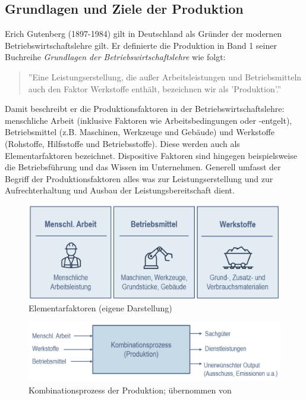 \documentclass[a4paper,12pt, german]{report}
\begin{document}
\subsection{Grundlagen und Ziele der Produktion}

Erich Gutenberg (1897-1984) gilt in Deutschland als Gründer der modernen Betriebswirtschaftslehre gilt. Er definierte die Produktion in Band 1 seiner Buchreihe \textit{Grundlagen der Betriebswirtschaftslehre} wie folgt:

\begin{quote}
 ''Eine Leistungserstellung, die außer Arbeitsleistungen und Betriebsmitteln auch den Faktor Werkstoffe enthält, bezeichnen wir als 'Produktion'.'' \cite{20}
\end{quote}

Damit beschreibt er die Produktionsfaktoren in der Betriebswirtschaftslehre: menschliche Arbeit (inklusive Faktoren wie Arbeitsbedingungen oder -entgelt), Betriebsmittel (z.B. Maschinen, Werkzeuge und Gebäude) und Werkstoffe (Rohstoffe, Hilfsstoffe und Betriebsstoffe). Diese werden auch als Elementarfaktoren bezeichnet. Dispositive Faktoren sind hingegen beispielsweise die Betriebsführung und das Wissen im Unternehmen. Generell umfasst der Begriff der Produktionsfaktoren alles was zur Leistungserstellung und zur Aufrechterhaltung und Ausbau der Leistungsbereitschaft dient. \cite{06}

\begin{figure}%
  \center
  \includegraphics[width=12cm]{images/Elementarfaktoren.pptx.png}
  \caption[Elementarfaktoren]{Elementarfaktoren (eigene Darstellung)}
\end{figure}

\begin{figure}%
  \center
  \includegraphics[width=12cm]{images/Kombinationsprozess.png}
  \caption[Kombinationsprozess der Produktion]{Kombinationsprozess der Produktion; übernommen von \cite{07} }
\end{figure}
\end{document}
